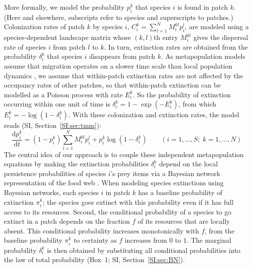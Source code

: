 \documentclass[11pt]{article}
\newcommand{\ud}{\text{d}}
\newcommand{\SI}{SI}
\begin{document}
More formally, we model the probability $p_i^k$ that species $i$ is found in patch $k$. (Here and elsewhere, subscripts refer to species and superscripts to patches.) Colonization rates of patch $k$ by species $i$, $C_i^k = \sum_{l=1}^N M_i^{kl} p_i^l$, are modeled using a species-dependent landscape matrix whose $(k,l)$th entry $M_i^{kl}$ gives the dispersal rate of species $i$ from patch $l$ to $k$. In turn, extinction rates are obtained from the probability $\delta_i^k$ that species $i$ disappears from patch $k$. As metapopulation models assume that migration operates on a slower time scale than local population dynamics \citep{Hanski1994}, we assume that within-patch extinction rates are not affected by the occupancy rates of other patches, so that within-patch extinction can be modelled as a Poisson process with rate $E_i^k$. So the probability of extinction occurring within one unit of time is $\delta_i^k = 1 - \exp(-E_i^k)$, from which $E_i^k = -\log(1-\delta_i^k)$. With these colonization and extinction rates, the model reads (\SI, Section~\ref{SI:sec:tmm}):
\begin{equation}
  \label{eq:model}
  \frac{\ud p_i^k}{\ud t} = (1 - p_i^k) \sum_{l=1}^N M_i^{kl} p_i^l +
  p_i^k \log(1 - \delta_i^k) \qquad (i = 1, \ldots, S; \; k = 1, \ldots, N)
\end{equation}
The central idea of our approach is to couple these independent metapopulation equations by making the extinction probabilities $\delta_i^k$ depend on the local persistence probabilities of species $i$'s prey items via a Bayesian network representation of the food web \citep{Eklofetal2013MEE}. When modeling species extinctions using Bayesian networks, each species $i$ in patch $k$ has a baseline probability of extinction $\pi_i^k$; the species goes extinct with this probability even if it has full access to its resources. Second, the conditional probability of a species to go extinct in a patch depends on the fraction $f$ of its resources that are locally absent. This conditional probability increases monotonically with $f$, from the baseline probability $\pi_i^k$ to certainty as $f$ increases from $0$ to $1$. The marginal probability $\delta_i^k$ is then obtained by substituting all conditional probabilities into the law of total probability (Box~1; \SI, Section~\ref{SI:sec:BN}).
\end{document}
